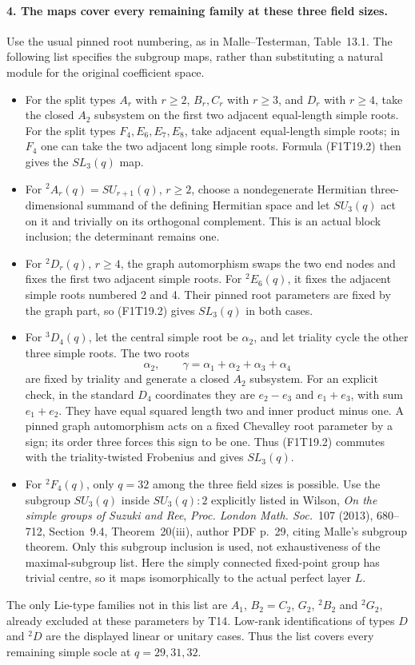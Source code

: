 \paragraph{4. The maps cover every remaining family at these three field sizes.}
Use the usual pinned root numbering, as in
Malle--Testerman, Table~13.1. The following list specifies
the subgroup maps, rather than substituting a natural
module for the original coefficient space.
\begin{itemize}
\item For the split types \(A_r\) with \(r\ge2\),
\(B_r,C_r\) with \(r\ge3\), and \(D_r\) with
\(r\ge4\), take the closed \(A_2\) subsystem on the
first two adjacent equal-length simple roots. For the
split types \(F_4,E_6,E_7,E_8\), take adjacent
equal-length simple roots; in \(F_4\) one can take
the two adjacent long simple roots. Formula (F1T19.2)
then gives the \(SL_3(q)\) map.
\item For \({}^2A_r(q)=SU_{r+1}(q)\), \(r\ge2\),
choose a nondegenerate Hermitian three-dimensional
summand of the defining Hermitian space and let
\(SU_3(q)\) act on it and trivially on its orthogonal
complement. This is an actual block inclusion; the
determinant remains one.
\item For \({}^2D_r(q)\), \(r\ge4\), the graph
automorphism swaps the two end nodes and fixes the
first two adjacent simple roots. For \({}^2E_6(q)\),
it fixes the adjacent simple roots numbered 2 and 4.
Their pinned root parameters are fixed by the graph
part, so (F1T19.2) gives \(SL_3(q)\) in both cases.
\item For \({}^3D_4(q)\), let the central simple root
be \(\alpha_2\), and let triality cycle the other three
simple roots. The two roots
\[
       \alpha_2,\qquad
       \gamma=\alpha_1+\alpha_2+\alpha_3+\alpha_4
 \tag{F1T19.12}
\]
are fixed by triality and generate a closed \(A_2\)
subsystem. For an explicit check, in the standard
\(D_4\) coordinates they are \(e_2-e_3\) and
\(e_1+e_3\), with sum \(e_1+e_2\). They have
equal squared length two and inner product minus one.
A pinned graph automorphism acts on a fixed Chevalley
root parameter by a sign; its order three forces this
sign to be one. Thus (F1T19.2) commutes with the
triality-twisted Frobenius and gives \(SL_3(q)\).
\item For \({}^2F_4(q)\), only \(q=32\) among the
three field sizes is possible. Use the subgroup
\(SU_3(q)\) inside \(SU_3(q):2\) explicitly listed
in Wilson, \emph{On the simple groups of Suzuki and
Ree}, \emph{Proc. London Math. Soc.}~107 (2013),
680--712, Section~9.4, Theorem~20(iii), author PDF
p.~29, citing Malle's subgroup theorem. Only this
subgroup inclusion is used, not exhaustiveness of the
maximal-subgroup list. Here the simply connected
fixed-point group has trivial centre, so it maps
isomorphically to the actual perfect layer \(L\).
\end{itemize}
The only Lie-type families not in this list are
\(A_1\), \(B_2=C_2\), \(G_2\), \({}^2B_2\) and
\({}^2G_2\), already excluded at these parameters by
T14. Low-rank identifications of types \(D\) and
\({}^2D\) are the displayed linear or unitary cases.
Thus the list covers every remaining simple socle
at \(q=29,31,32\).

